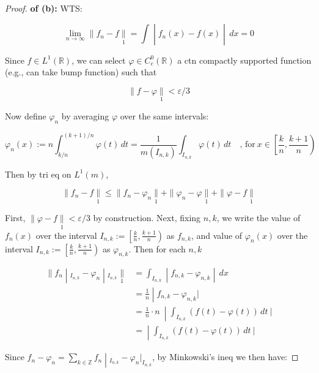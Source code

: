 \begin{proof}

\textbf{of (b):} WTS:

\[\left. \lim\limits_{n\rightarrow\infty} \parallel f_{n} - f\underset{1}{\parallel} = \int \middle| f_{n}(x) - f(x) \middle| \, dx = 0 \right.\]

Since \(f \in L^{1}(\mathbb{R})\), we can select \(\varphi \in C_{c}^{0}(\mathbb{R})\) a ctn compactly supported function (e.g., can take bump function) such that

\[\parallel f - \varphi\underset{1}{\parallel} < \varepsilon/3\]

Now define \(\varphi_{n}\) by averaging \(\varphi\) over the same intervals:

\[\varphi_{n}(x) := n\int_{k/n}^{(k + 1)/n}\varphi(t)\, dt = \frac{1}{m(I_{n,k})}\int_{I_{n,k}}\varphi(t)\, dt\quad\text{, for}\ x \in \left\lbrack {\frac{k}{n},\frac{k + 1}{n}} \right)\]

Then by tri eq on \(L^{1}(m)\),

\[\parallel f_{n} - f\underset{1}{\parallel} \leq \parallel f_{n} - \varphi_{n}\underset{1}{\parallel} + \parallel \varphi_{n} - \varphi\underset{1}{\parallel} + \parallel \varphi - f\underset{1}{\parallel}\]

First, \(\parallel \varphi - f\underset{1}{\parallel} < \varepsilon/3\) by construction. Next, fixing \(n,k\), we write the value of \(f_{n}(x)\) over the interval \(I_{n,k} := \left\lbrack {\frac{k}{n},\frac{k + 1}{n}} \right)\) as \(f_{n,k}\), and value of \(\varphi_{n}(x)\) over the interval \(I_{n,k} := \left\lbrack {\frac{k}{n},\frac{k + 1}{n}} \right)\) as \(\varphi_{n,k}\). Then for each \(n,k\)

\[\begin{matrix}
\left. \parallel f_{n} \middle| {}_{I_{n,k}} - \varphi_{n} \middle| {}_{I_{n,k}}\underset{1}{\parallel} \right. & \left. = \int_{I_{n,k}} \middle| f_{n,k} - \varphi_{n,k} \middle| \, dx \right. \\
 & \left. = \frac{1}{n} \middle| f_{n,k} - \varphi_{n,k}| \right. \\
 & \left. = \frac{1}{n} \cdot n\  \middle| \int_{I_{n,k}}(f(t) - \varphi(t))\, dt\ | \right. \\
 & \left. = \middle| \int_{I_{n,k}}(f(t) - \varphi(t))\, dt\ | \right.
\end{matrix}\]

Since \(\left. f_{n} - \varphi_{n} = \sum_{k \in \mathbb{Z}}f_{n} \middle| {}_{I_{n,k}} - \varphi_{n}|_{I_{n,k}} \right.\), by Minkowski's ineq we then have:


\end{proof}
